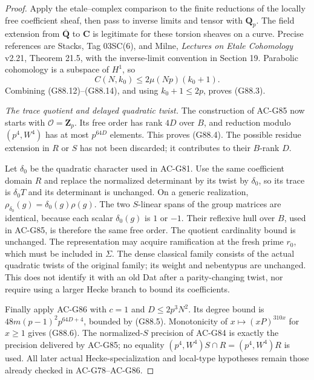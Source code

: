 \begin{proof}
Apply the etale--complex comparison to the finite reductions
of the locally free coefficient sheaf, then pass to inverse
limits and tensor with \(\mathbf Q_p\).
The field extension from \(\overline{\mathbf Q}\) to
\(\mathbf C\) is legitimate for these torsion sheaves on a
curve. Precise references are Stacks, Tag 03SC(6), and Milne,
\emph{Lectures on Etale Cohomology} v2.21, Theorem 21.5,
with the inverse-limit convention in Section 19.
Parabolic cohomology is a subspace of \(H^1\), so
\[
 C(N,k_0)\leq 2\mu(Np)(k_0+1).
 \tag{G88.14}
\]
Combining (G88.12)--(G88.14), and using \(k_0+1\leq2p\),
proves (G88.3).

\emph{The trace quotient and delayed quadratic twist.}
The construction of AC-G85 now starts with
\(\mathcal O=\mathbf Z_p\). Its free order has rank \(4D\)
over \(B\), and reduction modulo \((p^4,W^4)\) has at most
\(p^{64D}\) elements. This proves (G88.4).
The possible residue extension in \(R\) or \(S\) has not
been discarded; it contributes to their \(B\)-rank \(D\).

Let \(\delta_0\) be the quadratic character used in AC-G81.
Use the same coefficient domain \(R\) and replace the
normalized determinant by its twist by \(\delta_0\), so its
trace is \(\delta_0T\) and its determinant is unchanged.
On a generic realization,
\(\rho_{\delta_0}(g)=\delta_0(g)\rho(g)\).
The two \(S\)-linear spans of the group matrices are identical,
because each scalar \(\delta_0(g)\) is \(1\) or \(-1\).
Their reflexive hull over \(B\), used in AC-G85, is therefore
the same free order. The quotient cardinality bound is
unchanged. The representation may acquire ramification at
the fresh prime \(r_0\), which must be included in \(\Sigma\).
The dense classical family consists of the actual quadratic
twists of the original family; its weight and nebentypus are
unchanged. This does not identify it with an old Dat after a
parity-changing twist, nor require using a larger Hecke
branch to bound its coefficients.

Finally apply AC-G86 with \(c=1\) and \(D\leq2p^3N^2\).
Its degree bound is
\(48m(p-1)^2p^{64D+4}\), bounded by (G88.5).
Monotonicity of \(x\mapsto(xP)^{310x}\) for \(x\geq1\)
gives (G88.6). The normalized-\(S\) precision of AC-G84 is
exactly the precision delivered by AC-G85; no equality
\((p^4,W^4)S\cap R=(p^4,W^4)R\) is used.
All later actual Hecke-specialization and local-type
hypotheses remain those already checked in AC-G78--AC-G86.
\end{proof}

